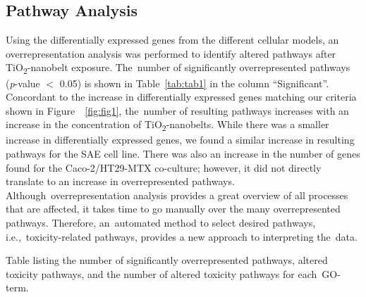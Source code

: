 \documentclass[ijms,article,accept,moreauthors,pdftex]{Definitions/mdpi}
\begin{document}
\begin{paracol}{2}
\switchcolumn
\vspace{-12pt}

\subsection{Pathway Analysis}
Using the differentially expressed genes from the different {cellular models}, an overrepresentation analysis was performed to identify altered pathways after TiO\textsubscript{2}-nanobelt exposure. The~number of significantly overrepresented pathways (\emph{p}-value $<$ 0.05) is shown in Table~\ref{tab:tab1} in the column “Significant”. Concordant to the increase in differentially expressed genes matching our criteria shown in Figure~~\ref{fig:fig1}, the~number of resulting pathways increases with {an increase} in the concentration of TiO\textsubscript{2}-nanobelts. {While} there was a smaller increase in differentially expressed genes, we found a similar increase in resulting pathways for the SAE cell line. There was also an increase in the number of genes found for the {Caco-2/HT29-MTX co-culture; however,} it did not directly translate to an increase in overrepresented pathways. Although~overrepresentation analysis provides a great overview of all processes that are affected, it takes time to go manually over the many overrepresented pathways. Therefore, an~automated method to select desired pathways, i.e.,~toxicity-related pathways, provides a new approach to interpreting the~data. 

\begin{specialtable}[H]
\caption{Table listing the number of significantly overrepresented pathways, altered toxicity pathways, and the number of altered toxicity pathways for each~GO-term.}\label{tab:tab1}
\end{specialtable}
\vspace{-12pt}




\end{paracol}
\end{document}
